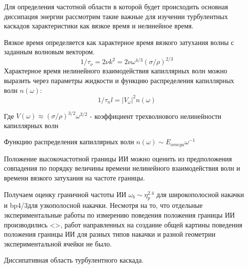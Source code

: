 Для определения частотной области в которой будет происходить основная диссипация энергии рассмотрим такие важные для изучении турбулентных каскадов характеристики как вязкое время и нелинейное время.

Вязкое время определяется как характерное время вязкого затухания волны с заданным волновым вектором.
\begin{equation}
1/\tau_\nu = 2\nu k^2 = 2 \nu \omega^{4/3}(\sigma/\rho)^{2/3}
\end{equation}
Характерное время нелинейного взаимодействия капиллярных волн можно выразить через параметры жидкости и функцию распределения капиллярных волн $n(\omega)$:
\begin{equation}
1/\tau_nl = |V_\omega|^2 n(\omega)
\end{equation}

Где $V(\omega) \approx (\sigma/\rho)^{3/2}\omega^{3/2}$ - коэффициент трехволнового нелинейности капиллярных волн

Функцию распределения капиллярных волн $n(\omega) \sim E_{omega}\omega^{-1}$ 

Положение высокочастотной границы ИИ можно оценить из предположения совпадения по порядку величины времени нелинейного взаимодействия волн и времени вязкого затухания на частоте границы.

Получаем оценку граничной частоты ИИ $\omega_b \sim \eta_p^{2.4}$ для широкополосной накачки и bp4/3для узкополосной накачки. Несмотря на то, что отдельные экспериментальные работы по измерению поведения положения границы ИИ производились <>, работ направленных на создание общей картины поведения положения границы ИИ для разных типов накачки и разной геометрии экспериментальной ячейки не было.

Диссипативная область турбулентного каскада.

